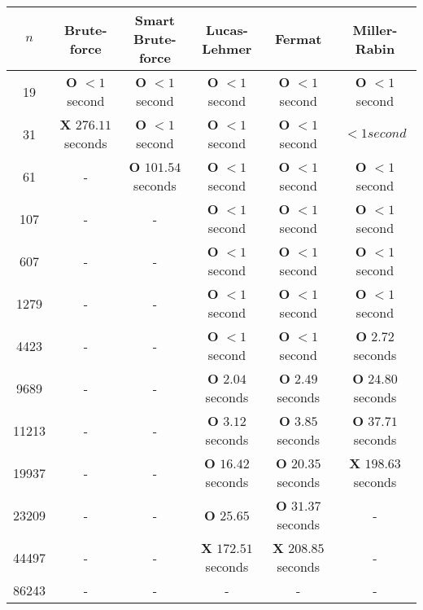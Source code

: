 \documentclass[main.tex]{subfiles}
\begin{document}
\begin{table}[ht!]
  \centering
  \begin{tabular}{||c | c c c c c||}
    \hline
    $n$ & Brute-force & Smart Brute-force & Lucas-Lehmer & Fermat & Miller-Rabin  \\ [0.5ex] 
    \hline\hline
    19 & \textbf{O} $<1$ second & \textbf{O} $<1$ second & \textbf{O} $<1$ second & \textbf{O} $<1$ second & \textbf{O} $<1$ second\\
    31 & \textbf{X} $276.11$ seconds & \textbf{O} $<1$ second & \textbf{O} $<1$ second & \textbf{O} $<1$ second & $<1 second$\\
    61 & - & \textbf{O} $101.54$ seconds & \textbf{O} $<1$ second & \textbf{O} $<1$ second & \textbf{O} $<1$ second\\
    107 & - & - & \textbf{O} $<1$ second & \textbf{O} $<1$ second & \textbf{O} $<1$ second\\
    607 & - & - & \textbf{O} $<1$ second & \textbf{O} $<1$ second & \textbf{O} $<1$ second\\
    1279 & - & - & \textbf{O} $<1$ second & \textbf{O} $<1$ second & \textbf{O} $<1$ second\\
    4423 & - & - & \textbf{O} $<1$ second & \textbf{O} $<1$ second & \textbf{O} $2.72$ seconds\\
    9689 & - & - & \textbf{O} $2.04$ seconds & \textbf{O} $2.49$ seconds & \textbf{O} $24.80$ seconds\\
    11213 & - & - & \textbf{O} $3.12$ seconds & \textbf{O} $3.85$ seconds & \textbf{O} $37.71$ seconds\\
    19937 & - & - & \textbf{O} $16.42$ seconds & \textbf{O} $20.35$ seconds & \textbf{X} $198.63$ seconds\\
    23209 & - & - & \textbf{O} $25.65$ & \textbf{O} $31.37$ seconds & -\\ 
    44497 & - & - & \textbf{X} $172.51$ seconds & \textbf{X} $208.85$ seconds & -\\ 
    86243 & - & - & - & - & -\\  [1ex] 
    \hline
  \end{tabular}
\end{table}
\end{document}
